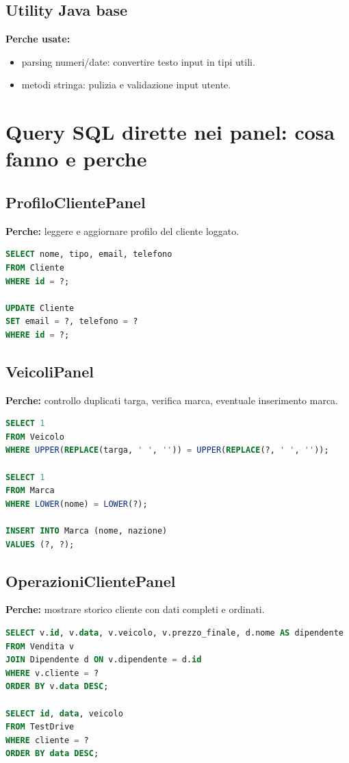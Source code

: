 \documentclass[12pt,a4paper]{article}
\begin{document}
\subsection{Utility Java base}
\textbf{Perche usate:}
\begin{itemize}
  \item parsing numeri/date: convertire testo input in tipi utili.
  \item metodi stringa: pulizia e validazione input utente.
\end{itemize}

\section{Query SQL dirette nei panel: cosa fanno e perche}

\subsection{ProfiloClientePanel}
\textbf{Perche:} leggere e aggiornare profilo del cliente loggato.
\begin{lstlisting}[style=sqlstyle,language=SQL]
SELECT nome, tipo, email, telefono
FROM Cliente
WHERE id = ?;

UPDATE Cliente
SET email = ?, telefono = ?
WHERE id = ?;
\end{lstlisting}

\subsection{VeicoliPanel}
\textbf{Perche:} controllo duplicati targa, verifica marca, eventuale inserimento marca.
\begin{lstlisting}[style=sqlstyle,language=SQL]
SELECT 1
FROM Veicolo
WHERE UPPER(REPLACE(targa, ' ', '')) = UPPER(REPLACE(?, ' ', ''));

SELECT 1
FROM Marca
WHERE LOWER(nome) = LOWER(?);

INSERT INTO Marca (nome, nazione)
VALUES (?, ?);
\end{lstlisting}

\subsection{OperazioniClientePanel}
\textbf{Perche:} mostrare storico cliente con dati completi e ordinati.
\begin{lstlisting}[style=sqlstyle,language=SQL]
SELECT v.id, v.data, v.veicolo, v.prezzo_finale, d.nome AS dipendente
FROM Vendita v
JOIN Dipendente d ON v.dipendente = d.id
WHERE v.cliente = ?
ORDER BY v.data DESC;

SELECT id, data, veicolo
FROM TestDrive
WHERE cliente = ?
ORDER BY data DESC;
\end{lstlisting}
\end{document}
